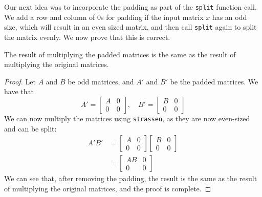 \documentclass[11pt]{scrartcl}
\theoremstyle{dotlessP}
\theoremstyle{dotlessN}
\theoremstyle{dotN}
\begin{document}
Our next idea was to incorporate the padding as part of the \texttt{split} function call. We add a row and column of 0s for padding if the input matrix $x$ has an odd size, which will result in an even sized matrix, and then call \texttt{split} again to split the matrix evenly. We now prove that this is correct.
\begin{claim}
   The result of multiplying the padded matrices is the same as the result of multiplying the original matrices.
\end{claim}
\begin{proof}
    Let $A$ and $B$ be odd matrices, and $A'$ and $B'$ be the padded matrices. We have that
    \[
    A' = \begin{bmatrix}
        A & 0 \\
        0 & 0
    \end{bmatrix}, \quad B' = \begin{bmatrix}
        B & 0 \\
        0 & 0
    \end{bmatrix}
    \] 
    We can now multiply the matrices using \texttt{strassen}, as they are now even-sized and can be split:
    \begin{align*}
        A'B' &= \begin{bmatrix}
            A & 0 \\
            0 & 0
        \end{bmatrix}\begin{bmatrix}
            B & 0 \\
            0 & 0
        \end{bmatrix} \\
             &= \begin{bmatrix}
                 AB & 0 \\
                 0 & 0
             \end{bmatrix}
    \end{align*}
    We can see that, after removing the padding, the result is the same as the result of multiplying the original
    matrices, and the proof is complete.
\end{proof}
\end{document}
